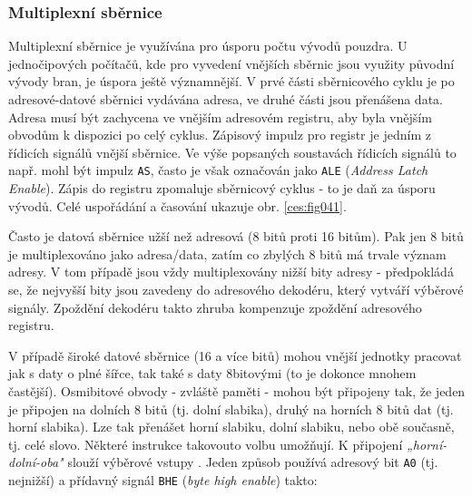       \subsubsection{Multiplexní sběrnice}\label{MIT:chap_mltiplex_bus} 
        Multiplexní sběrnice je využívána pro úsporu počtu vývodů pouzdra. U jednočipových počítačů,
        kde pro vyvedení vnějších sběrnic jsou využity původní vývody bran, je úspora ještě
        významnější. V prvé části sběrnicového cyklu je po adresové-datové sběrnici vydávána adresa,
        ve druhé části jsou přenášena data. Adresa musí být zachycena ve vnějším adresovém registru,
        aby byla vnějším obvodům k dispozici po celý cyklus. Zápisový impulz pro registr je jedním z
        řídicích signálů vnější sběrnice. Ve výše popsaných soustavách řídicích signálů to např.
        mohl být impulz \texttt{AS}, často je však označován jako \texttt{ALE} (\emph{Address Latch
        Enable}). Zápis do registru zpomaluje sběrnicový cyklus - to je daň za úsporu vývodů. Celé
        uspořádání a časování ukazuje obr. \ref{ces:fig041}.

              
        Často je datová sběrnice užší než adresová (8 bitů proti 16 bitům). Pak jen 8 bitů je
        multiplexováno jako adresa/data, zatím co zbylých 8 bitů má trvale význam adresy. V tom
        případě jsou vždy multiplexovány nižší bity adresy - předpokládá se, že nejvyšší bity jsou
        zavedeny do adresového dekodéru, který vytváří výběrové signály. Zpoždění dekodéru takto
        zhruba kompenzuje zpoždění adresového registru.
        
        V případě široké datové sběrnice (16 a více bitů) mohou vnější jednotky pracovat jak s daty
        o plné šířce, tak také s daty 8bitovými (to je dokonce mnohem častější). Osmibitové obvody -
        zvláště paměti -  mohou být připojeny tak, že jeden je připojen na dolních 8 bitů (tj. dolní
        slabika), druhý na horních 8 bitů dat (tj. horní slabika). Lze tak přenášet horní slabiku,
        dolní slabiku, nebo obě současně, tj. celé slovo. Některé instrukce takovouto volbu
        umožňují. K připojení \emph{„horní-dolní-oba"} slouží výběrové vstupy
        . Jeden způsob používá adresový bit \texttt{A0} (tj. nejnižší) a
        přídavný signál \texttt{BHE} (\emph{byte high enable}) takto:

